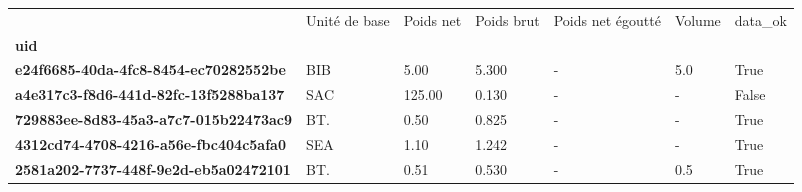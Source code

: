 \begin{tabularx}{\linewidth}{lXXXXXX}
\toprule
{} & Unité de base &  Poids net &  Poids brut &  Poids net égoutté &  Volume &  data\_ok \\
\textbf{uid                                 } &               &            &             &                    &         &          \\
\midrule
\textbf{e24f6685-40da-4fc8-8454-ec70282552be} &           BIB &       5.00 &       5.300 &                  - &     5.0 &     True \\
\textbf{a4e317c3-f8d6-441d-82fc-13f5288ba137} &           SAC &     125.00 &       0.130 &                  - &       - &    False \\
\textbf{729883ee-8d83-45a3-a7c7-015b22473ac9} &           BT. &       0.50 &       0.825 &                  - &       - &     True \\
\textbf{4312cd74-4708-4216-a56e-fbc404c5afa0} &           SEA &       1.10 &       1.242 &                  - &       - &     True \\
\textbf{2581a202-7737-448f-9e2d-eb5a02472101} &           BT. &       0.51 &       0.530 &                  - &     0.5 &     True \\
\bottomrule
\end{tabularx}
